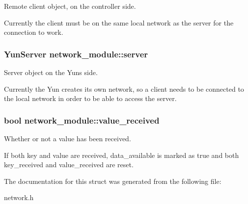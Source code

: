 Remote client object, on the controller side. 

Currently the client must be on the same local network as the server for the connection to work. \hypertarget{structnetwork__module_a82b787509d4348843a4831156866c57e}{}
\subsubsection[{server}]{\setlength{\rightskip}{0pt plus 5cm}Yun\+Server network\+\_\+module\+::server}\label{structnetwork__module_a82b787509d4348843a4831156866c57e}


Server object on the Yun\textquotesingle{}s side. 

Currently the Yun creates its own network, so a client needs to be connected to the local network in order to be able to access the server. \hypertarget{structnetwork__module_a0b70928a73be3f659343f22be8a24f3e}{}
\subsubsection[{value\+\_\+received}]{\setlength{\rightskip}{0pt plus 5cm}bool network\+\_\+module\+::value\+\_\+received}\label{structnetwork__module_a0b70928a73be3f659343f22be8a24f3e}


Whether or not a value has been received. 

If both key and value are received, data\+\_\+available is marked as true and both key\+\_\+received and value\+\_\+received are reset. 

The documentation for this struct was generated from the following file\+:\begin{DoxyCompactItemize}
\item 
network.\+h\end{DoxyCompactItemize}
